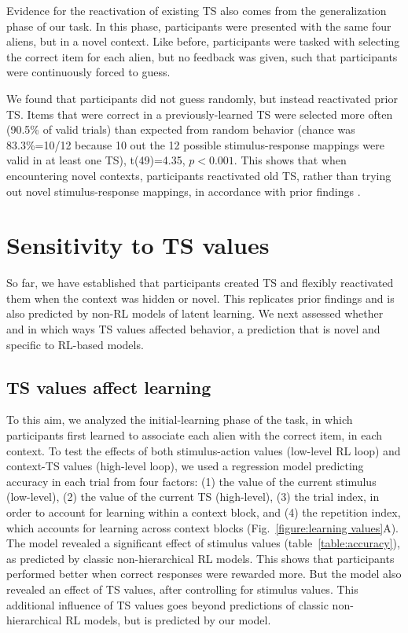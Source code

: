 \documentclass[10pt, letterpaper]{article}
\begin{document}
Evidence for the reactivation of existing TS also comes from the generalization phase of our task. In this phase, participants were presented with the same four aliens, but in a novel context. Like before, participants were tasked with selecting the correct item for each alien, but no feedback was given, such that participants were continuously forced to guess.

We found that participants did not guess randomly, but instead reactivated prior TS. Items that were correct in a previously-learned TS were selected more often (90.5\% of valid trials) than expected from random behavior (chance was 83.3\%=10/12 because 10 out the 12 possible stimulus-response mappings were valid in at least one TS), t(49)=4.35, $p<0.001$. This shows that when encountering novel contexts, participants reactivated old TS, rather than trying out novel stimulus-response mappings, in accordance with prior findings \cite{collins_cognitive_2013}.


\section{Sensitivity to TS values}

So far, we have established that participants created TS and flexibly reactivated them when the context was hidden or novel. This replicates prior findings and is also predicted by non-RL models of latent learning. We next assessed whether and in which ways TS values affected behavior, a prediction that is novel and specific to RL-based models.


\subsection{TS values affect learning}

To this aim, we analyzed the initial-learning phase of the task, in which participants first learned to associate each alien with the correct item, in each context. To test the effects of both stimulus-action values (low-level RL loop) and context-TS values (high-level loop), we used a regression model predicting accuracy in each trial from four factors: (1) the value of the current stimulus (low-level), (2) the value of the current TS (high-level), (3) the trial index, in order to account for learning within a context block, and (4) the repetition index, which accounts for learning across context blocks (Fig.~\ref{figure:learning values}A). The model revealed a significant effect of stimulus values (table~\ref{table:accuracy}), as predicted by classic non-hierarchical RL models. This shows that participants performed better when correct responses were rewarded more. But the model also revealed an effect of TS values, after controlling for stimulus values. This additional influence of TS values goes beyond predictions of classic non-hierarchical RL models, but is predicted by our model.
\end{document}
